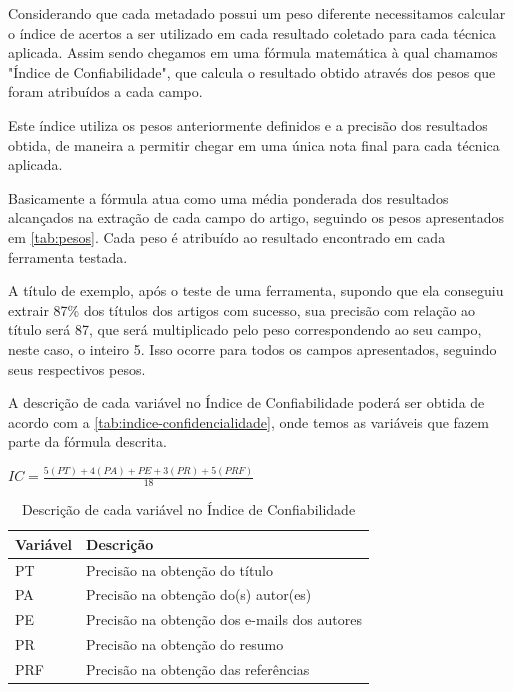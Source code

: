 
Considerando que cada metadado possui um peso diferente necessitamos calcular o índice de acertos a ser utilizado em cada resultado coletado para cada técnica aplicada. Assim sendo chegamos em uma fórmula matemática à qual chamamos "Índice de Confiabilidade", que calcula o resultado obtido através dos pesos que foram atribuídos a cada campo.

Este índice utiliza os pesos anteriormente definidos e a precisão dos resultados obtida, de maneira a permitir chegar em uma única nota final para cada técnica aplicada.

Basicamente a fórmula atua como uma média ponderada dos resultados alcançados na extração de cada campo do artigo, seguindo os pesos apresentados em \autoref{tab:pesos}. Cada peso é atribuído ao resultado encontrado em cada ferramenta testada. 

A título de exemplo, após o teste de uma ferramenta, supondo que ela conseguiu extrair 87\% dos títulos dos artigos com sucesso, sua precisão com relação ao título será 87, que será multiplicado pelo peso correspondendo ao seu campo, neste caso, o inteiro 5. Isso ocorre para todos os campos apresentados, seguindo seus respectivos pesos.

A descrição de cada variável no Índice de Confiabilidade poderá ser obtida de acordo com a \autoref{tab:indice-confidencialidade}, onde temos as variáveis que fazem parte da fórmula descrita.

\begin{center}
	$ IC=\frac{5(PT)+4(PA)+PE+3(PR)+5(PRF)}{18} $
\end{center}

\begin{table}
    \caption{Descrição de cada variável no Índice de Confiabilidade}
    \begin{center}
    	\begin{tabular}{|p{3cm}|p{8cm}|}
			\hline \textbf{Variável} & \textbf{Descrição}\\ 
			\hline PT & Precisão na obtenção do título \\
			\hline PA & Precisão na obtenção do(s) autor(es)\\
			\hline PE & Precisão na obtenção dos e-mails dos autores \\
			\hline PR & Precisão na obtenção do resumo \\
			\hline PRF & Precisão na obtenção das referências \\
	    	\hline 
    	\end{tabular} 
    \end{center}
  	\label{tab:indice-confidencialidade}
\end{table}